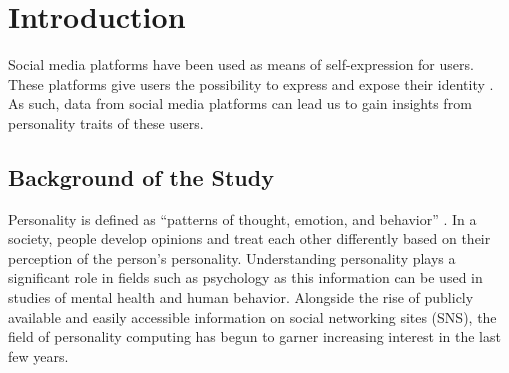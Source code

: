 %
%
%                 

\chapter{Introduction}
\label{sec:intro}    %

Social media platforms have been used as means of self-expression for users. These platforms give users the possibility to express and expose their identity \citep{Marcus2006}. As such, data from social media platforms can lead us to gain insights from personality traits of these users. 




\section{Background of the Study}
\label{sec:overview}

%
%




Personality is defined as “patterns of thought, emotion, and behavior” \citep{Vinciarelli2014}. In a society, people develop opinions and treat each other differently based on their perception of the person’s personality. Understanding personality plays a significant role in fields such as psychology as this information can be used in studies of mental health and human behavior. Alongside the rise of publicly available and easily accessible information on social networking sites (SNS), the field of personality computing has begun to garner increasing interest in the last few years. 

